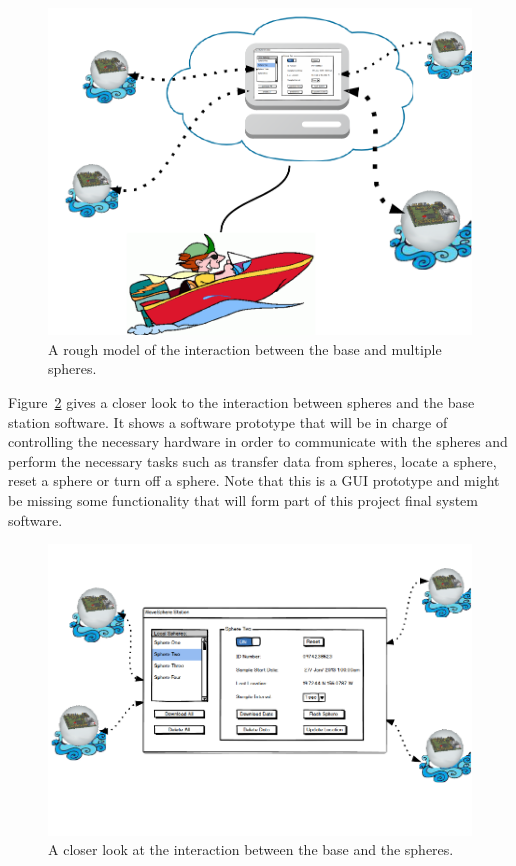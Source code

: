 \begin{figure}[H]
	\centering
	\includegraphics[scale=0.6]{img/GSV2}
	\caption{A rough model of the interaction between the base and multiple spheres. \label{fig:GSV2}}
\end{figure}

Figure~\ref{fig:GSV3} gives a closer look to the interaction between spheres and the base station software.  It shows a software prototype that will be in charge of controlling the necessary hardware in order to communicate with the spheres and perform the necessary tasks such as transfer data from spheres, locate a sphere, reset a sphere or turn off a sphere.  Note that this is a GUI prototype and might be missing some functionality that will form part of this project final system software.  

\begin{figure}[H]
	\centering
	\includegraphics[scale=0.6]{img/GSV3}
	\caption{A closer look at the interaction between the base and the spheres. \label{fig:GSV3}}
\end{figure}

